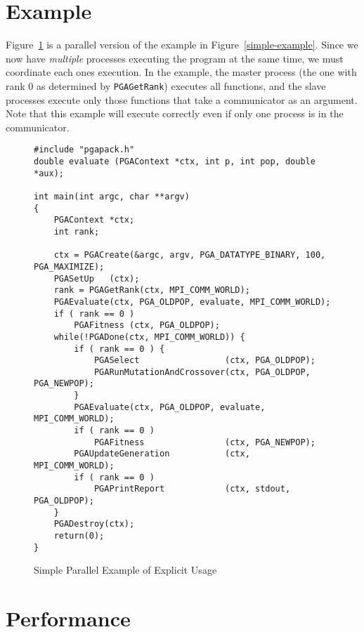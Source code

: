 \documentclass{report}
\begin{document}
\section{Example}\label{sec:par-example}

Figure~\ref{simple-parexample} is a parallel version of the example in
Figure~\ref{simple-example}.  Since we now have {\em multiple} processes
executing the program at the same time, we must coordinate each ones
execution.  In the example, the master process (the one with rank 0 as
determined by {\tt PGAGetRank}) executes all functions, and the slave
processes execute only those functions that take a communicator as an
argument.  Note that this example will execute correctly even if only one
process is in the communicator.

\begin{figure}
\begin{verbatim}
#include "pgapack.h"
double evaluate (PGAContext *ctx, int p, int pop, double *aux);

int main(int argc, char **argv)
{
    PGAContext *ctx;
    int rank;

    ctx = PGACreate(&argc, argv, PGA_DATATYPE_BINARY, 100, PGA_MAXIMIZE);
    PGASetUp   (ctx);
    rank = PGAGetRank(ctx, MPI_COMM_WORLD);
    PGAEvaluate(ctx, PGA_OLDPOP, evaluate, MPI_COMM_WORLD);
    if ( rank == 0 )
        PGAFitness (ctx, PGA_OLDPOP);
    while(!PGADone(ctx, MPI_COMM_WORLD)) {
        if ( rank == 0 ) {
            PGASelect                 (ctx, PGA_OLDPOP);
            PGARunMutationAndCrossover(ctx, PGA_OLDPOP, PGA_NEWPOP);
        }
        PGAEvaluate(ctx, PGA_OLDPOP, evaluate, MPI_COMM_WORLD);
        if ( rank == 0 )
            PGAFitness                (ctx, PGA_NEWPOP);
        PGAUpdateGeneration           (ctx, MPI_COMM_WORLD);
        if ( rank == 0 )
            PGAPrintReport            (ctx, stdout, PGA_OLDPOP);
    }
    PGADestroy(ctx);
    return(0);
}
\end{verbatim}
\caption{Simple Parallel Example of Explicit Usage}
\label{simple-parexample}
\end{figure}



\section{Performance}\label{sec:par-performance}
\end{document}
